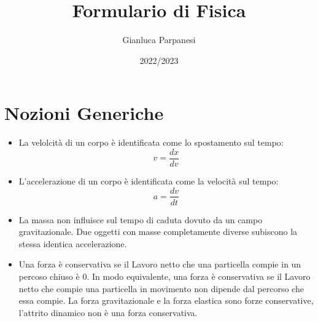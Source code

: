 \documentclass[12pt, a4paper, openany]{book}
\begin{document}
\title{Formulario di Fisica}
\author{Gianluca Parpanesi}
\date{2022/2023}
\maketitle

\tableofcontents
\newpage

\section*{Nozioni Generiche}

\begin{itemize}
    \item La velolcità di un corpo è identificata come lo spostamento sul tempo:
        \begin{equation*}
            v = \frac{dx}{dv}
        \end{equation*}
    \item L'accelerazione di un corpo è identificata come la velocità sul tempo:
        \begin{equation*}
            a = \frac{dv}{dt}
        \end{equation*}
    \item La massa non influisce sul tempo di caduta dovuto da un campo 
        gravitazionale. Due oggetti con masse completamente diverse subiscono la
        stessa identica accelerazione.
    \item Una forza è conservativa se il Lavoro netto che una particella compie
    in un percoso chiuso è 0. In modo equivalente, una forza è conservativa 
    se il Lavoro netto che compie una particella in movimento non dipende dal 
    percorso che essa compie. La forza gravitazionale e la forza elastica sono
    forze conservative, l'attrito dinamico non è una forza conservativa.
    

\end{itemize}
\end{document}

